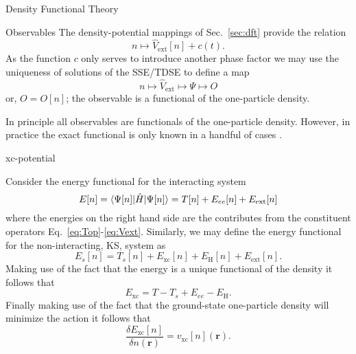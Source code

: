 \documentclass[letterpaper, 12 pt]{report}
\begin{document}
\begin{chapter}{Density Functional Theory \label{chap:dft}}
\begin{section}{Observables \label{sec:obs}}
      The density-potential mappings of Sec.\ \ref{sec:dft} provide the relation
      \begin{equation} \label{eq:denpot}
         n \mapsto \hat{V}_\mathrm{ext}[n] + c(t).
      \end{equation}
      As the function $c$ only serves to introduce another phase factor we may use the uniqueness of
      solutions of the SSE/TDSE to define a map
      \begin{equation} \label{eq:obsfunc2}
         n \mapsto \hat{V}_\mathrm{ext} \mapsto \Psi \mapsto O
      \end{equation}
      or, $O = O[n]$; the observable is a functional of the one-particle density.

      In principle all observables are functionals of the one-particle density. However, in practice the
      exact functional is only known in a handful of cases \cite[p. 211-213]{obs_exac}.

   \end{section}

   \begin{section}{xc-potential \label{sec:xcpot}}

      Consider the energy functional for the interacting system
      \begin{equation} \label{eq:efunc}
         E[n] = \braket{\Psi[n] | \hat{H} | \Psi[n] }= T[n] + E_{ee}[n] + E_\mathrm{ext}[n]
      \end{equation}
      where the energies on the right hand side are the contributes from the constituent operators
      Eq.\ \eqref{eq:Top}-\eqref{eq:Vext}. Similarly, we may define the energy functional for the
      non-interacting, KS, system as
      \begin{equation} \label{eq:esfunc}
         E_s[n] =  T_s[n] + E_\mathrm{xc}[n] + E_\mathrm{H}[n] + E_\mathrm{ext}[n].
      \end{equation}
      Making use of the fact that the energy is a unique functional of the density it follows that
      \begin{equation} \label{eq:exc}
         E_\mathrm{xc} = T - T_s + E_{ee} - E_\mathrm{H}.
      \end{equation}
      Finally making use of the fact that the ground-state one-particle density will minimize the action
      it follows that
      \begin{equation} \label{eq:vxc-der}
         \frac{\delta E_\mathrm{xc}[n]}{\delta n(\mathbf{r})} = v_\mathrm{xc}[n](\mathbf{r}).
      \end{equation}


\end{section}
\end{chapter}
\end{document}
